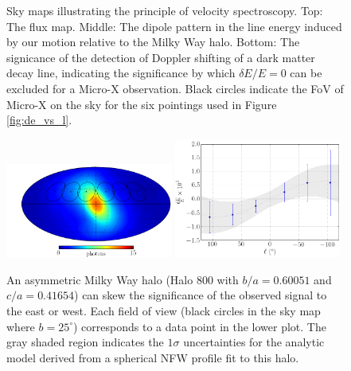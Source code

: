 \documentclass[aps,prd,10pt,twocolumn,superscriptaddress,showpacs,footinbib]{revtex4-1}
\begin{document}
\begin{figure}[h!]
\caption{Sky maps illustrating the principle of velocity spectroscopy. Top: The flux map. Middle:
	The dipole pattern in the line energy induced by our motion relative to the Milky Way halo.
	Bottom: The signicance of the detection of Doppler shifting of a dark matter decay line,
indicating the significance by which $\delta E/E=0$ can be excluded for a Micro-X
observation. Black circles indicate the
FoV of Micro-X on the sky for the six pointings used in Figure \ref{fig:de_vs_l}. }
\label{fig:skymaps}
\end{figure}




\begin{figure}[!thpb]
\centering
	\includegraphics[width=0.49\textwidth]{flux_map_800.png}
	\includegraphics[width=0.49\textwidth]{de_vs_l_800.png}
\caption{An asymmetric Milky Way halo (Halo 800 with $b/a = 0.60051$ and $c/a = 0.41654$) can skew the significance of the
	observed signal to the east or west. Each field of view (black circles in the sky map where $b = 25^\circ$) corresponds to a data point in
the lower plot. The gray shaded region indicates the $1\sigma$ uncertainties for the analytic model
derived from a spherical NFW profile fit to this halo.}
\label{fig:triax}
\end{figure}
\end{document}
